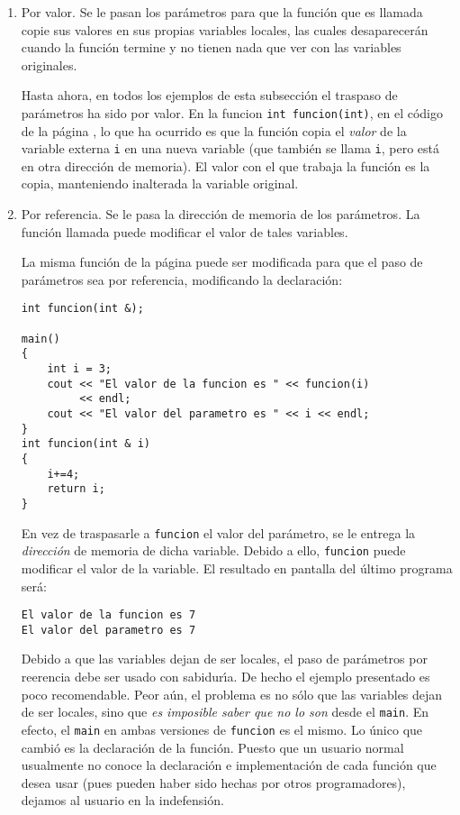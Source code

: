 \begin{enumerate}
\item[a)] Por valor. Se le pasan los par{\'a}metros para que la funci{\'o}n
  que es llamada copie sus valores en sus propias variables locales,
  las cuales desaparecer{\'a}n cuando la funci{\'o}n termine y no tienen nada
  que ver con las variables originales.

Hasta ahora, en todos los ejemplos de esta subsecci\'on el traspaso de
par\'ametros ha sido por valor. En la funcion \verb+int funcion(int)+,
en el c\'odigo de la p\'agina \pageref{int_funcion_int}, 
lo que ha
ocurrido es que la funci{\'o}n copia el {\em valor\/} de la variable
externa \verb+i+ en una nueva variable (que tambi{\'e}n se llama \verb+i+,
pero est{\'a} en otra direcci{\'o}n de memoria).  El valor con el que trabaja
la funci{\'o}n es la copia, manteniendo inalterada la variable original.



\item[b)] Por referencia. Se le pasa la direcci{\'o}n de memoria de los
  par{\'a}metros. La funci{\'o}n llamada puede modificar el valor de tales
  variables.
\label{referencia}

La misma funci\'on de la p\'agina \pageref{int_funcion_int} puede ser
modificada para que el paso de par\'ametros sea por referencia,
modificando la declaraci\'on:
\begin{verbatim}
int funcion(int &);

main()
{
    int i = 3;
    cout << "El valor de la funcion es " << funcion(i) 
         << endl;
    cout << "El valor del parametro es " << i << endl;
}
int funcion(int & i)
{
    i+=4;
    return i;
}
\end{verbatim}

En vez de traspasarle
a \verb+funcion+ el valor del par{\'a}metro, se le entrega la
{\em direcci{\'o}n\/} de memoria de dicha variable. Debido a ello,
\verb+funcion+ puede modificar el valor de la variable. 
El resultado en pantalla del {\'u}ltimo programa ser{\'a}:
\begin{verbatim}
El valor de la funcion es 7
El valor del parametro es 7
\end{verbatim}

Debido a que las variables dejan de ser locales, el paso de
par\'ametros por reerencia debe ser usado con sabidur\'{\i}a. De hecho
el ejemplo presentado es poco recomendable. Peor a\'un, el problema es
no s\'olo que las variables dejan de ser locales, sino que {\em es
  imposible saber que no lo son\/} desde el \verb+main+. En efecto, el
\verb+main+ en ambas versiones de \verb+funcion+ es el mismo. Lo
\'unico que cambi\'o es la declaraci\'on de la funci\'on. Puesto que
un usuario normal usualmente no conoce la declaraci\'on e
implementaci\'on de cada funci\'on que desea usar (pues pueden haber
sido hechas por otros programadores), dejamos al usuario en la
indefensi\'on. 


\end{enumerate}
